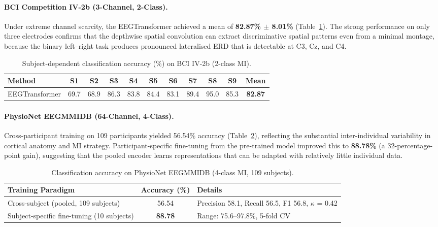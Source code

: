 \documentclass[12pt, a4paper]{article}
\begin{document}
\paragraph{BCI Competition IV-2b (3-Channel, 2-Class).}

Under extreme channel scarcity, the EEGTransformer achieved a mean of \textbf{82.87\% $\pm$ 8.01\%} (Table~\ref{tab:iv2b_results}). The strong performance on only three electrodes confirms that the depthwise spatial convolution can extract discriminative spatial patterns even from a minimal montage, because the binary left--right task produces pronounced lateralised ERD that is detectable at C3, Cz, and C4.

\begin{table}[htbp]
\centering
\caption{Subject-dependent classification accuracy (\%) on BCI IV-2b (2-class MI).}
\label{tab:iv2b_results}
\begin{tabular}{lcccccccccc}
\toprule
\textbf{Method} & \textbf{S1} & \textbf{S2} & \textbf{S3} & \textbf{S4} & \textbf{S5} & \textbf{S6} & \textbf{S7} & \textbf{S8} & \textbf{S9} & \textbf{Mean} \\
\midrule
EEGTransformer & 69.7 & 68.9 & 86.3 & 83.8 & 84.4 & 83.1 & 89.4 & 95.0 & 85.3 & \textbf{82.87} \\
\bottomrule
\end{tabular}
\end{table}

\paragraph{PhysioNet EEGMMIDB (64-Channel, 4-Class).}

Cross-participant training on 109 participants yielded 56.54\% accuracy (Table~\ref{tab:physionet_results}), reflecting the substantial inter-individual variability in cortical anatomy and MI strategy. Participant-specific fine-tuning from the pre-trained model improved this to \textbf{88.78\%} (a 32-percentage-point gain), suggesting that the pooled encoder learns representations that can be adapted with relatively little individual data.

\begin{table}[htbp]
\centering
\caption{Classification accuracy on PhysioNet EEGMMIDB (4-class MI, 109 subjects).}
\label{tab:physionet_results}
\begin{tabular}{@{} l c >{\raggedright\arraybackslash}p{6.5cm} @{}}
\toprule
\textbf{Training Paradigm} & \textbf{Accuracy (\%)} & \textbf{Details} \\
\midrule
Cross-subject (pooled, 109 subjects) & 56.54 & Precision 58.1, Recall 56.5, F1 56.8, $\kappa$ = 0.42 \\
Subject-specific fine-tuning (10 subjects) & \textbf{88.78} & Range: 75.6--97.8\%, 5-fold CV \\
\bottomrule
\end{tabular}
\end{table}
\end{document}
